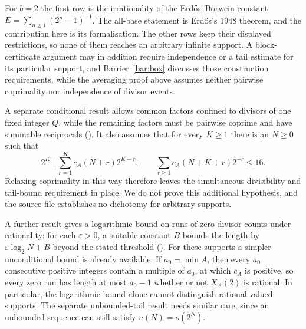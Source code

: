 For $b=2$ the first row is the irrationality of the Erd\H{o}s--Borwein
constant $E=\sum_{n\ge1}(2^n-1)^{-1}$. The all-base statement is
Erd\H{o}s's 1948 theorem, and the contribution here is its formalisation.
The other rows keep their displayed restrictions, so none of them reaches
an arbitrary infinite support. A block-certificate argument may in
addition require independence or a tail estimate for its particular
support, and Barrier~\ref{bar:box} discusses those construction
requirements, while the averaging proof above assumes neither pairwise
coprimality nor independence of divisor events.

A separate conditional result allows common factors confined to divisors
of one fixed integer $Q$, while the remaining factors must be pairwise
coprime and have summable reciprocals
().
It also assumes that for every $K\ge1$ there is an $N\ge0$ such that
\[
 2^K\mid\sum_{r=1}^K c_A(N+r)2^{K-r},\qquad
 \sum_{r\ge1}c_A(N+K+r)2^{-r}\le16.
\]
Relaxing coprimality in this way therefore leaves the simultaneous
divisibility and tail-bound requirement in place. We do not prove this
additional hypothesis, and the source file establishes no dichotomy for
arbitrary supports.

A further result gives a logarithmic bound on runs of zero divisor counts
under rationality: for each $\varepsilon>0$, a suitable constant $B$ bounds
the length by $\varepsilon\log_2N+B$ beyond the stated threshold
().
For these supports a simpler unconditional bound is already available.
If $a_0=\min A$, then every $a_0$ consecutive positive integers contain a
multiple of $a_0$, at which $c_A$ is positive, so every zero run has
length at most $a_0-1$ whether or not $X_A(2)$ is rational. In particular,
the logarithmic bound alone cannot distinguish rational-valued supports.
The separate unbounded-tail result
needs similar care, since an unbounded sequence can still satisfy
$u(N)=o(2^N)$.

